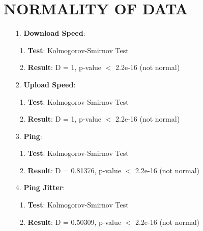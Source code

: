 \documentclass[conference]{IEEEtran}
\begin{document}
\section{NORMALITY OF DATA}
\begin{enumerate}
    \item[1.]    
    \textbf{Download Speed}: 
    \begin{enumerate}
        \item \textbf{Test}: Kolmogorov-Smirnov Test
        \item \textbf{Result}: D = 1, p-value $<$ 2.2e-16 (not normal)
    \end{enumerate}

    \item[2.]
    \textbf{Upload Speed}:
    \begin{enumerate}
        \item \textbf{Test}: Kolmogorov-Smirnov Test
        \item \textbf{Result}: D = 1, p-value $<$ 2.2e-16 (not normal)
    \end{enumerate}

    \item[3.]
    \textbf{Ping}:
    \begin{enumerate}
        \item \textbf{Test}: Kolmogorov-Smirnov Test
        \item \textbf{Result}: D = 0.81376, p-value $<$ 2.2e-16 (not normal)
    \end{enumerate}

    \item[4.] 
    \textbf{Ping Jitter}: 
    \begin{enumerate}
        \item \textbf{Test}: Kolmogorov-Smirnov Test
        \item \textbf{Result}: D = 0.50309, p-value $<$ 2.2e-16 (not normal)
    \end{enumerate}
\end{enumerate}
\end{document}
